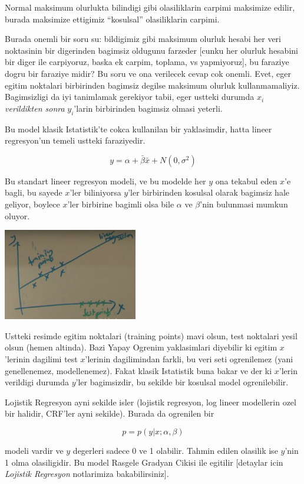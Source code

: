 \documentclass[12pt,fleqn]{article}\usepackage{../common}
\begin{document}
Normal maksimum olurlukta bilindigi gibi olasiliklarin carpimi maksimize
edilir, burada maksimize ettigimiz ``kosulsal'' olasiliklarin carpimi. 

Burada onemli bir soru su: bildigimiz gibi maksimum olurluk hesabi her veri
noktasinin bir digerinden bagimsiz oldugunu farzeder [cunku her olurluk
hesabini bir diger ile carpiyoruz, baska ek carpim, toplama, vs
yapmiyoruz], bu faraziye dogru bir faraziye midir? Bu soru ve ona verilecek
cevap cok onemli. Evet, eger egitim noktalari birbirinden bagimsiz degilse
maksimum olurluk kullanmamaliyiz. Bagimsizligi da iyi tanimlamak gerekiyor
tabii, eger ustteki durumda $x_i$ {\em verildikten sonra} $y_i$'larin
birbirinden bagimsiz olmasi yeterli.

Bu model klasik Istatistik'te cokca kullanilan bir yaklasimdir, hatta
lineer regresyon'un temeli ustteki faraziyedir. 

$$ y = \alpha + \bar{\beta}\bar{x} + N(0,\sigma^2) $$

Bu standart lineer regresyon modeli, ve bu modelde her $y$ ona tekabul eden
$x$'e bagli, bu sayede $x$'ler biliniyorsa $y$'ler birbirinden kosulsal
olarak bagimsiz hale geliyor, boylece $x$'ler birbirine bagimli olsa bile
$\alpha$ ve $\beta$'nin bulunmasi mumkun oluyor. 

\includegraphics[height=4cm]{crf_1.png}

Ustteki resimde egitim noktalari (training points) mavi olsun, test
noktalari yesil olsun (hemen altinda). Bazi Yapay Ogrenim yaklasimlari
diyebilir ki egitim $x$'lerinin dagilimi test $x$'lerinin dagilimindan
farkli, bu veri seti ogrenilemez (yani genellenemez, modellenemez). Fakat
klasik Istatistik buna bakar ve der ki $x$'lerin verildigi durumda $y$'ler
bagimsizdir, bu sekilde bir kosulsal model ogrenilebilir.

Lojistik Regresyon ayni sekilde isler (lojistik regresyon, log lineer
modellerin ozel bir halidir, CRF'ler ayni sekilde). Burada
da ogrenilen bir

$$ p = p(y | x;\alpha,\beta) $$

modeli vardir ve $y$ degerleri sadece 0 ve 1 olabilir. Tahmin edilen
olasilik ise $y$'nin 1 olma olasiligidir. Bu model Rasgele Gradyan Cikisi
ile egitilir [detaylar icin {\em Lojistik Regresyon} notlarimiza
bakabilirsiniz].
\end{document}
